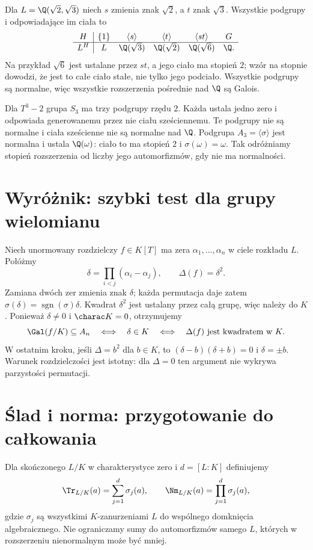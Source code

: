 Dla $L=\Q(\sqrt2,\sqrt3)$ niech $s$ zmienia znak $\sqrt2$, a $t$ znak $\sqrt3$. Wszystkie podgrupy i odpowiadające im ciała to
\[
\begin{array}{c|ccccc}
H & \{1\} & \langle s\rangle & \langle t\rangle & \langle st\rangle & G\\ \hline
L^H & L & \Q(\sqrt3) & \Q(\sqrt2) & \Q(\sqrt6) & \Q.
\end{array}
\]
Na przykład $\sqrt6$ jest ustalane przez $st$, a jego ciało ma stopień $2$; wzór na stopnie dowodzi, że jest to całe ciało stałe, nie tylko jego podciało. Wszystkie podgrupy są normalne, więc wszystkie rozszerzenia pośrednie nad $\Q$ są Galois.

Dla $T^3-2$ grupa $S_3$ ma trzy podgrupy rzędu $2$. Każda ustala jedno zero i odpowiada generowanemu przez nie ciału sześciennemu. Te podgrupy nie są normalne i ciała sześcienne nie są normalne nad $\Q$. Podgrupa $A_3=\langle\sigma\rangle$ jest normalna i ustala $\Q(\omega)$: ciało to ma stopień $2$ i $\sigma(\omega)=\omega$. Tak odróżniamy stopień rozszerzenia od liczby jego automorfizmów, gdy nie ma normalności.

\section{Wyróżnik: szybki test dla grupy wielomianu}

Niech unormowany rozdzielczy $f\in K[T]$ ma zera $\alpha_1,\dots,\alpha_n$ w ciele rozkładu $L$. Połóżmy
\[
\delta=\prod_{i<j}(\alpha_i-\alpha_j),\qquad \Delta(f)=\delta^2.
\]
Zamiana dwóch zer zmienia znak $\delta$; każda permutacja daje zatem $\sigma(\delta)=\operatorname{sgn}(\sigma)\delta$. Kwadrat $\delta^2$ jest ustalany przez całą grupę, więc należy do $K$. Ponieważ $\delta\ne0$ i $\charac K=0$, otrzymujemy
\[
\Gal(f/K)\subseteq A_n\quad\Longleftrightarrow\quad \delta\in K
\quad\Longleftrightarrow\quad \Delta(f)\text{ jest kwadratem w }K.
\]
W ostatnim kroku, jeśli $\Delta=b^2$ dla $b\in K$, to $(\delta-b)(\delta+b)=0$ i $\delta=\pm b$. Warunek rozdzielczości jest istotny: dla $\Delta=0$ ten argument nie wykrywa parzystości permutacji.

\section{Ślad i norma: przygotowanie do całkowania}

Dla skończonego $L/K$ w charakterystyce zero i $d=[L:K]$ definiujemy
\[
\Tr_{L/K}(a)=\sum_{j=1}^d\sigma_j(a),\qquad
\Nm_{L/K}(a)=\prod_{j=1}^d\sigma_j(a),
\]
gdzie $\sigma_j$ są wszystkimi $K$-zanurzeniami $L$ do wspólnego domknięcia algebraicznego. Nie ograniczamy sumy do automorfizmów samego $L$, których w rozszerzeniu nienormalnym może być mniej.

